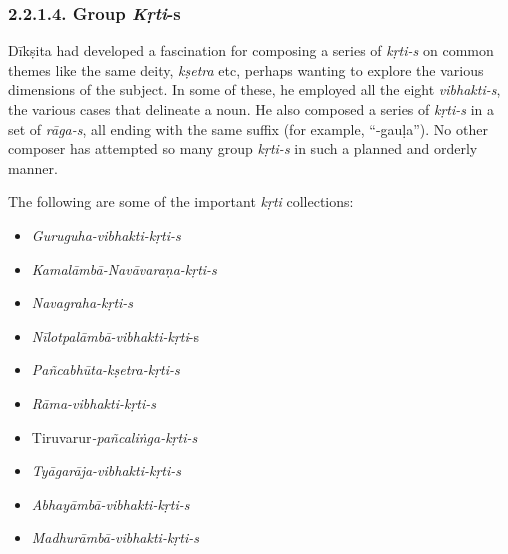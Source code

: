 \subsubsection*{2.2.1.4. Group \textit{Kṛti}-s}

Dīkṣita had developed a fascination for composing a series of \textit{kṛti-s} on common themes like the same deity, \textit{kṣetra} etc, perhaps wanting to explore the various dimensions of the subject. In some of these, he employed all the eight \textit{vibhakti-s}, the various cases that delineate a noun. He also composed a series of \textit{kṛti-s} in a set of \textit{rāga-s}, all ending with the same suffix (for example, “-gauḷa”). No other composer has attempted so many group \textit{kṛti-s} in such a planned and orderly manner.

The following are some of the important \textit{kṛti} collections:

\vspace{-.2cm}

\begin{itemize}
\itemsep=0pt

 \item \textit{Guruguha-vibhakti-kṛti-s}

 \item \textit{Kamalāmbā-Navāvaraṇa-kṛti-s}

 \item \textit{Navagraha-kṛti-s}

 \item \textit{Nīlotpalāmbā-vibhakti-kṛti}-s

 \item \textit{Pañcabhūta-kṣetra-kṛti-s}

 \item \textit{Rāma-vibhakti-kṛti-s}

 \item Tiruvarur\textit{-pañcaliṅga-kṛti-s}

 \item \textit{Tyāgarāja-vibhakti-kṛti-s}

 \item \textit{Abhayāmbā-vibhakti-kṛti-s}

 \item \textit{Madhurāmbā-vibhakti-kṛti-s}

\end{itemize}



